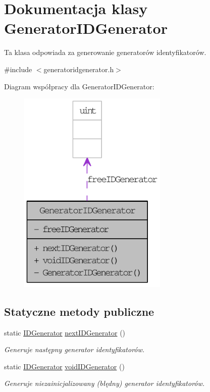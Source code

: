 \hypertarget{classGeneratorIDGenerator}{
\section{Dokumentacja klasy GeneratorIDGenerator}
\label{classGeneratorIDGenerator}
}


Ta klasa odpowiada za generowanie generatorów identyfikatorów.  




{\ttfamily \#include $<$generatoridgenerator.h$>$}



Diagram współpracy dla GeneratorIDGenerator:\nopagebreak
\begin{figure}[H]
\begin{center}
\leavevmode
\includegraphics[width=202pt]{classGeneratorIDGenerator__coll__graph}
\end{center}
\end{figure}
\subsection*{Statyczne metody publiczne}
\begin{DoxyCompactItemize}
\item 
static \hyperlink{classIDGenerator}{IDGenerator} \hyperlink{classGeneratorIDGenerator_ac6dd43ecbbe2ed1647855e72156dbcb2}{nextIDGenerator} ()
\begin{DoxyCompactList}\small\item\em Generuje następny generator identyfikatorów. \item\end{DoxyCompactList}\item 
static \hyperlink{classIDGenerator}{IDGenerator} \hyperlink{classGeneratorIDGenerator_af0d8b94b08eac9bfbeea41ef974d8745}{voidIDGenerator} ()
\begin{DoxyCompactList}\small\item\em Generuje niezainicjalizowany (błędny) generator identyfikatorów. \item\end{DoxyCompactList}\end{DoxyCompactItemize}
